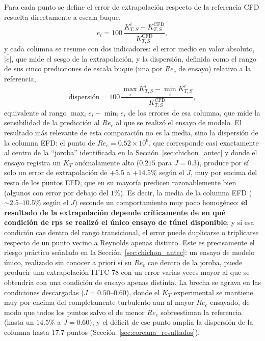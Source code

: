 Para cada punto se define el error de extrapolación respecto de la referencia CFD
resuelta directamente a escala buque,
%
\begin{equation}
e_i = 100\,\frac{K_{T,S}^{i}-K_{T,S}^{\mathrm{CFD}}}{K_{T,S}^{\mathrm{CFD}}},
\label{eq:error_extrap}
\end{equation}
%
y cada columna se resume con dos indicadores: el error medio en valor absoluto,
$\overline{|e|}$, que mide el sesgo de la extrapolación, y la dispersión, definida como
el rango de sus cinco predicciones de escala buque (una por $Re_c$ de ensayo) relativo a
la referencia,
%
\begin{equation}
\text{dispersión} = 100\,\frac{\max_i K_{T,S}^{i}-\min_i K_{T,S}^{i}}
{K_{T,S}^{\mathrm{CFD}}},
\label{eq:dispersion}
\end{equation}
%
equivalente al rango $\max_i e_i-\min_i e_i$ de los errores de esa columna, que mide la
sensibilidad de la predicción al $Re_c$ al que se realizó el ensayo de modelo. El resultado más
relevante de esta comparación no es la media, sino la dispersión de la columna EFD: el
punto de $Re_c = 0.52\times10^6$, que corresponde casi exactamente
al centro de la ``joroba'' identificada en la Sección~\ref{sec:chichon_antec} y donde el ensayo registra un $K_T$ anómalamente alto ($0.215$ para $J=0.3$), produce por sí
solo un error de extrapolación de $+5.5$ a $+14.5\%$ según el $J$, muy por encima del
resto de los puntos EFD, que en su mayoría predicen razonablemente bien (algunos con
error por debajo del $1\%$). Es decir, la media de la columna EFD ($\sim2.5$--$10.5\%$
según el $J$) esconde un comportamiento muy poco homogéneo: \textbf{el resultado de la
extrapolación depende críticamente de en qué condición de rps se realizó el único
ensayo de túnel disponible}, y si esa condición cae dentro del rango transicional, el
error puede duplicarse o triplicarse respecto de un punto vecino a Reynolds apenas
distinto. Este es precisamente el riesgo práctico señalado en la
Sección~\ref{sec:chichon_antec}: un ensayo de modelo único, realizado sin conocer a
priori si su $Re_c$ cae dentro de la joroba, puede producir una extrapolación ITTC-78
con un error varias veces mayor al que se obtendría con una condición de ensayo apenas
distinta. La brecha se agrava en las condiciones descargadas ($J=0.50$--$0.60$), donde
el $K_T$ experimental se mantiene muy por encima del completamente turbulento aun al
mayor $Re_c$ ensayado, de modo que todos los puntos salvo el de menor $Re_c$ sobreestiman
la referencia (hasta un $14.5\%$ a $J=0.60$), y el déficit de ese punto amplía la
dispersión de la columna hasta $17.7$ puntos (Sección~\ref{sec:coreana_resultados}).

